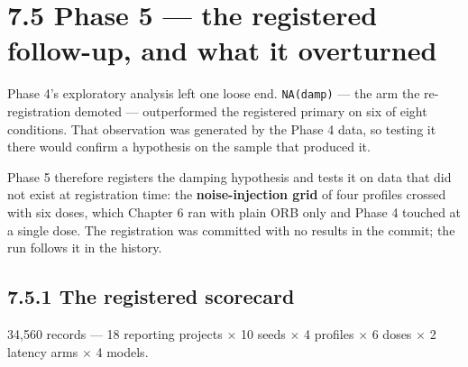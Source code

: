 \section{7.5 Phase 5 --- the registered follow-up, and what it
overturned}\label{phase-5-the-registered-follow-up-and-what-it-overturned}

Phase 4's exploratory analysis left one loose end. \texttt{NA(damp)} ---
the arm the re-registration demoted --- outperformed the registered
primary on six of eight conditions. That observation was generated by
the Phase 4 data, so testing it there would confirm a hypothesis on the
sample that produced it.

Phase 5 therefore registers the damping hypothesis and tests it on data
that did not exist at registration time: the \textbf{noise-injection
grid} of four profiles crossed with six doses, which Chapter 6 ran with
plain ORB only and Phase 4 touched at a single dose. The registration
was committed with no results in the commit; the run follows it in the
history.

\subsection{7.5.1 The registered
scorecard}\label{the-registered-scorecard}

34,560 records --- 18 reporting projects \ensuremath{\times} 10 seeds \ensuremath{\times} 4 profiles \ensuremath{\times} 6
doses \ensuremath{\times} 2 latency arms \ensuremath{\times} 4 models.


